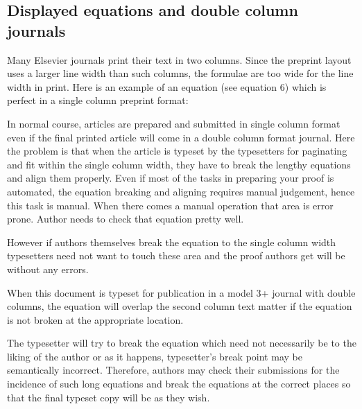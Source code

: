 \documentclass[a4paper,12pt]{article}
\begin{document}
\enlargethispage*{\baselineskip}

\subsection*{Displayed equations and double column journals}

Many Elsevier journals print their text in two columns. Since
the preprint layout uses a larger line width than such columns,
the formulae are too wide for the line width in print. Here is an
example of an equation  (see equation 6) which is perfect in a
single column preprint format:

In normal course, articles are prepared and submitted in single column
format even if the final printed article will come in a double column
format journal. Here the problem is that when the article is typeset by
the typesetters for paginating and fit within the single column width,
they have to break the lengthy equations and align them properly. Even
if most of the tasks in preparing your proof is automated, the equation
breaking and aligning requires manual judgement, hence this task is manual.
When there comes a manual operation that area is error prone. Author
needs to check that equation pretty well.

However if authors themselves break the equation to the single column
width typesetters need not want to touch these area and the proof authors
get will be without any errors.

\setlength\Sep{6pt}
\def\rulecolor{blue!70}
\def\rulecolor{orange}

\noindent When this document is typeset for publication in a
model 3+ journal with double columns, the equation will overlap
the second column text matter if the equation is not broken at
the appropriate location.

\vspace*{6pt}
\def\rulecolor{blue!70}
\def\rulecolor{orange}
\vspace*{6pt}

\noindent The typesetter will try to break the equation which
need not necessarily be to the liking of the author or as it
happens, typesetter's break point may be semantically incorrect.
Therefore, authors may check their submissions for the incidence
of such long equations and break the equations at the correct
places so that the final typeset copy will be as they wish.
\end{document}
